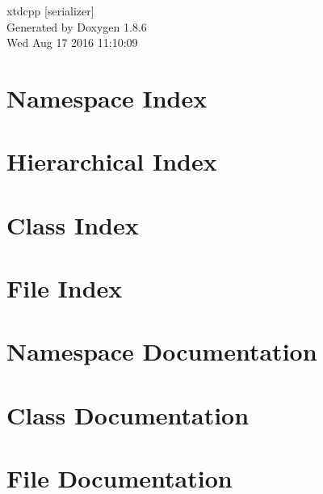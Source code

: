\documentclass[twoside]{book}
\newcommand{\clearemptydoublepage}{%
  \newpage{\pagestyle{empty}\cleardoublepage}%
}
\begin{document}
\hypersetup{pageanchor=false}
\begin{titlepage}
\vspace*{7cm}
\begin{center}%
{\Large xtdcpp \mbox{[}serializer\mbox{]} }\\
\vspace*{1cm}
{\large Generated by Doxygen 1.8.6}\\
\vspace*{0.5cm}
{\small Wed Aug 17 2016 11:10:09}\\
\end{center}
\end{titlepage}
\clearemptydoublepage
\tableofcontents
\clearemptydoublepage
{}
\hypersetup{pageanchor=true}

\chapter{Namespace Index}

\chapter{Hierarchical Index}

\chapter{Class Index}

\chapter{File Index}

\chapter{Namespace Documentation}





\chapter{Class Documentation}













\chapter{File Documentation}









\newpage
{}
{}
\printindex
\end{document}
